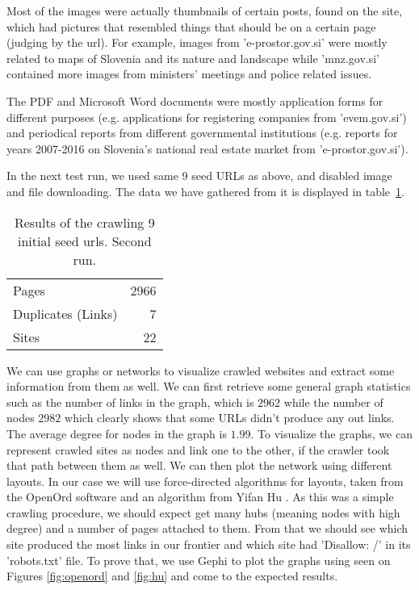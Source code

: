 \documentclass[9pt]{IEEEtran}
\begin{document}
Most of the images were actually thumbnails of certain posts, found on the site, which had pictures that resembled things that should be on a certain page (judging by the url).
For example, images from 'e-prostor.gov.si' were mostly related to maps of Slovenia and its nature and landscape while 'mnz.gov.si' contained more images from ministers' meetings and police related issues.

The PDF and Microsoft Word documents were mostly application forms for different purposes (e.g. applications for registering companies from 'evem.gov.si') and periodical reports from different governmental institutions (e.g. reports for years 2007-2016 on Slovenia's national real estate market from 'e-prostor.gov.si').

In the next test run, we used same 9 seed URLs as above, and disabled image and file downloading. The data we have gathered from it is displayed in table~\ref{tab:results2}.
\begin{table}[H]
    \begin{center}
    \caption{Results of the crawling 9 initial seed urls. Second run.}
        \begin{tabular}{ l | r }
        Pages & 2966 \\
        Duplicates (Links) & 7 \\
        Sites & 22 \\
        \end{tabular}
    \label{tab:results2}
    \end{center}
\end{table}



We can use graphs or networks to visualize crawled websites and extract some information from them as well.
We can first retrieve some general graph statistics such as the number of links in the graph, which is $2962$ while the number of nodes $2982$ which clearly shows that some URLs didn't produce any out links.
The average degree for nodes in the graph is $1.99$.
To visualize the graphs, we can represent crawled sites as nodes and link one to the other, if the crawler took that path between them as well.
We can then plot the network using different layouts.
In our case we will use force-directed algorithms for layouts, taken from the OpenOrd software \cite{Martin2011} and an algorithm from Yifan Hu \cite{Hu2005}.
As this was a simple crawling procedure, we should expect get many hubs (meaning nodes with high degree) and a number of pages attached to them.
From that we should see which site produced the most links in our frontier and which site had 'Disallow: /' in its 'robots.txt' file.
To prove that, we use Gephi to plot the graphs using seen on Figures \ref{fig:openord} and \ref{fig:hu} and come to the expected results.
\end{document}
